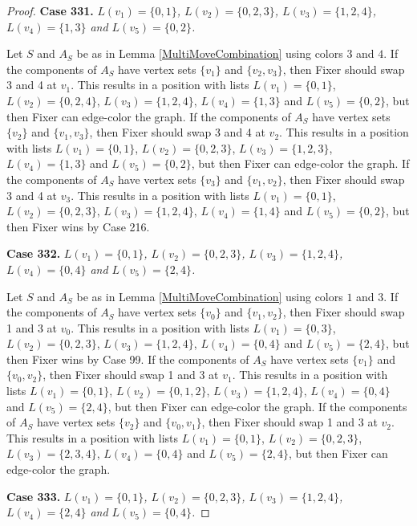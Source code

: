 \documentclass[12pt]{amsart}
\theoremstyle{plain}
\theoremstyle{definition}
\theoremstyle{remark}
\begin{document}
\begin{proof}
\noindent\textbf{Case 331.  }\textit{$L(v_1) = \{0, 1\}$, $L(v_2) = \{0, 2, 3\}$, $L(v_3) = \{1, 2, 4\}$, $L(v_4) = \{1, 3\}$ and $L(v_5) = \{0, 2\}$.}

Let $S$ and $A_S$ be as in Lemma \ref{MultiMoveCombination} using colors $3$ and $4$. If the components of $A_S$ have vertex sets $\{v_1\}$ and $\{v_2, v_3\}$, then Fixer should swap 3 and 4 at $v_1$. This results in a position with lists $L(v_1) = \{0, 1\}$, $L(v_2) = \{0, 2, 4\}$, $L(v_3) = \{1, 2, 4\}$, $L(v_4) = \{1, 3\}$ and $L(v_5) = \{0, 2\}$, but then Fixer can edge-color the graph. If the components of $A_S$ have vertex sets $\{v_2\}$ and $\{v_1, v_3\}$, then Fixer should swap 3 and 4 at $v_2$. This results in a position with lists $L(v_1) = \{0, 1\}$, $L(v_2) = \{0, 2, 3\}$, $L(v_3) = \{1, 2, 3\}$, $L(v_4) = \{1, 3\}$ and $L(v_5) = \{0, 2\}$, but then Fixer can edge-color the graph. If the components of $A_S$ have vertex sets $\{v_3\}$ and $\{v_1, v_2\}$, then Fixer should swap 3 and 4 at $v_3$. This results in a position with lists $L(v_1) = \{0, 1\}$, $L(v_2) = \{0, 2, 3\}$, $L(v_3) = \{1, 2, 4\}$, $L(v_4) = \{1, 4\}$ and $L(v_5) = \{0, 2\}$, but then Fixer wins by Case 216. 

\noindent\textbf{Case 332.  }\textit{$L(v_1) = \{0, 1\}$, $L(v_2) = \{0, 2, 3\}$, $L(v_3) = \{1, 2, 4\}$, $L(v_4) = \{0, 4\}$ and $L(v_5) = \{2, 4\}$.}

Let $S$ and $A_S$ be as in Lemma \ref{MultiMoveCombination} using colors $1$ and $3$. If the components of $A_S$ have vertex sets $\{v_0\}$ and $\{v_1, v_2\}$, then Fixer should swap 1 and 3 at $v_0$. This results in a position with lists $L(v_1) = \{0, 3\}$, $L(v_2) = \{0, 2, 3\}$, $L(v_3) = \{1, 2, 4\}$, $L(v_4) = \{0, 4\}$ and $L(v_5) = \{2, 4\}$, but then Fixer wins by Case 99. If the components of $A_S$ have vertex sets $\{v_1\}$ and $\{v_0, v_2\}$, then Fixer should swap 1 and 3 at $v_1$. This results in a position with lists $L(v_1) = \{0, 1\}$, $L(v_2) = \{0, 1, 2\}$, $L(v_3) = \{1, 2, 4\}$, $L(v_4) = \{0, 4\}$ and $L(v_5) = \{2, 4\}$, but then Fixer can edge-color the graph. If the components of $A_S$ have vertex sets $\{v_2\}$ and $\{v_0, v_1\}$, then Fixer should swap 1 and 3 at $v_2$. This results in a position with lists $L(v_1) = \{0, 1\}$, $L(v_2) = \{0, 2, 3\}$, $L(v_3) = \{2, 3, 4\}$, $L(v_4) = \{0, 4\}$ and $L(v_5) = \{2, 4\}$, but then Fixer can edge-color the graph. 

\noindent\textbf{Case 333.  }\textit{$L(v_1) = \{0, 1\}$, $L(v_2) = \{0, 2, 3\}$, $L(v_3) = \{1, 2, 4\}$, $L(v_4) = \{2, 4\}$ and $L(v_5) = \{0, 4\}$.}


\end{proof}
\end{document}
